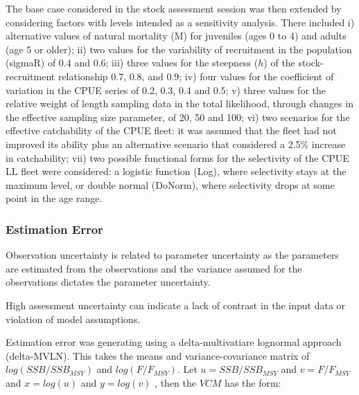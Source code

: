 \documentclass[a4paper]{article}
\begin{document}
The base case considered in the stock assessment session was then extended by considering factors with levels intended as a sensitivity analysis. There included i) alternative values of natural mortality (M) for juveniles (ages 0 to 4) and adults (age 5 or older); ii) two values for the variability of recruitment in the population (sigmaR) of 0.4 and 0.6; iii) three values for the steepness ($h$) of the stock-recruitment relationship 0.7, 0.8, and 0.9; iv) four values for the coefficient of variation in the CPUE series of 0.2, 0.3, 0.4 and 0.5; v) three values for the relative weight of length sampling data in the total likelihood, through changes in the effective sampling size parameter, of 20, 50 and 100; vi) two scenarios for the effective catchability of the CPUE fleet: it was assumed that the fleet had not improved its ability plus an alternative scenario that considered a 2.5\% increase in catchability; vii) two possible functional forms for the selectivity of the CPUE LL fleet were considered: a logistic function (Log), where selectivity stays at the maximum level, or double normal (DoNorm), where selectivity drops at some point in the age range.


\subsubsection*{Estimation Error}

Observation uncertainty is related to parameter uncertainty as the parameters are estimated from the observations and the variance assumed for the observations dictates the parameter uncertainty.

High assessment uncertainty can indicate a lack of contrast in  the input data or violation of model assumptions.


Estimation error was generating using a delta-multivatiare lognormal approach (delta-MVLN). This takes the means and variance-covariance matrix of $log(SSB/SSB_{MSY})$ and $log(F/F_{MSY})$. Let $u = SSB/SSB_{MSY}$ and $v = F/F_{MSY}$  and $x = log(u)$ and $y = log(v)$ , then the $VCM$ has the form:
    			
\end{document}
